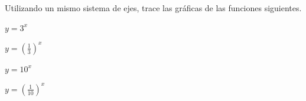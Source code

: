 \item Utilizando un mismo sistema de ejes, trace las gráficas de las funciones siguientes.
\begin{enumerate}
    \begin{minipage}{0.45\textwidth}
    \item[(a)] $y = 3^x$
    \item[(c)] $\displaystyle y = \left(\frac{1}{3}\right)^x$
    \end{minipage}%
    \begin{minipage}{0.45\textwidth}
    \item[(b)] $y = 10^x$
    \item[(d)] $\displaystyle y = \left(\frac{1}{10}\right)^x$
    \end{minipage}
\end{enumerate}
